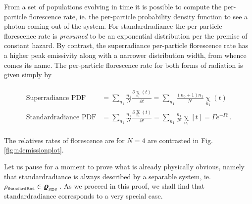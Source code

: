 \documentclass[
  12pt          %
  ,letterpaper  %
  ,center       %
  ,noupper      %
  ,english,fleqn]{uconnthesis}
\newcommand{\LeftEqns}[1]{\begin{fleqn}[\leftmargini minus \leftmargini]\begin{align}#1\end{align}\end{fleqn}}
\newcommand{\FlushEqn}[1]{\LeftEqns{\begin{split}#1\end{split}}}
\newcommand{\fig}[1]{Fig.\,\ref{#1}}
\newcommand{\ox}[2]{{\operatorname{X}\limits_{#2}^{}}}
\newcommand{\ochi}[2]{{\operatorname{\chi}\limits_{#2}^{}}}
\newcommand{\brho}[0]{\bm{\mbox{\large \(\varrho\)}}}
\begin{document}
From a set of populations evolving in time it is possible to compute the per-particle florescence rate, ie. the per-particle probability density function to see a photon coming out of the system. For standardradiance the per-particle florescence rate is {\em presumed} to be an exponential distribution per the premise of constant hazard. By contrast, the superradiance per-particle florescence rate has a higher peak emissivity along with a narrower distribution width, from whence comes its name. The per-particle florescence rate for both forms of radiation is given simply by
\noindent\FlushEqn{\label{eq:frates}
\text{Superradiance PDF} &= \sum_{n_1}{\frac{n_1}{N} \frac{\partial \ochi{n_0}{n_1}\left(t\right)}{\partial t}} = \sum_{n_1}{\frac{\left(n_0+1\right)n_1}{N} \ochi{n_0}{n_1}\left(t\right)}
\\\text{Standardradiance PDF} &= \sum_{n_1}{\frac{n_1}{N} \frac{\partial \ox{n_0}{n_1}\left(t\right)}{\partial t}} = \sum_{n_1}{\frac{n_1}{N} \ochi{n_0}{n_1}\left[t\right]}=\Gamma e^{-\Gamma t}\,.
}
The relatives rates of florescence are  for  $N=4$ are contrasted in \fig{fig:n4emissionplot}.

Let us pause for a moment to prove what is already physically obvious, namely that standardradiance is always described by a separable system, ie. $\rho_{\text{\tiny StandardRad}}\in \brho_{\text{\tiny SDS}}\,$. As we proceed in this proof, we shall find that standardradiance corresponds to a very special case.
\end{document}
